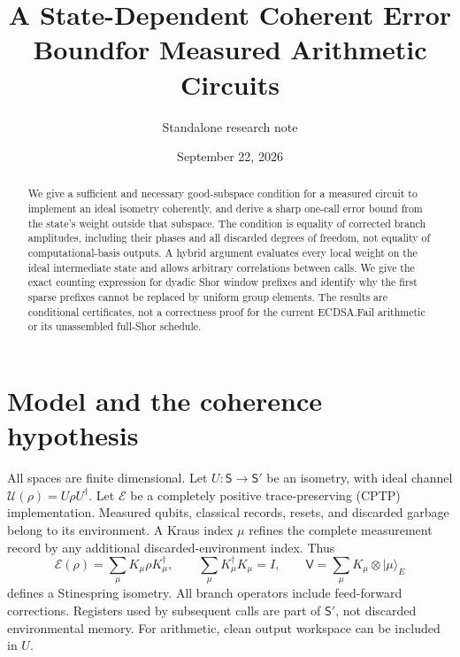 \documentclass[11pt]{article}
\title{A State-Dependent Coherent Error Bound\newline for Measured Arithmetic Circuits}
\author{Standalone research note}
\date{September 22, 2026}
\newcommand{\ket}[1]{\lvert #1\rangle}
\newcommand{\EE}{\mathcal E}
\newcommand{\UU}{\mathcal U}
\newcommand{\VV}{\mathsf V}
\begin{document}
\maketitle

\begin{abstract}
We give a sufficient and necessary good-subspace condition for a measured circuit to implement an ideal isometry coherently, and derive a sharp one-call error bound from the state's weight outside that subspace. The condition is equality of corrected branch amplitudes, including their phases and all discarded degrees of freedom, not equality of computational-basis outputs. A hybrid argument evaluates every local weight on the ideal intermediate state and allows arbitrary correlations between calls. We give the exact counting expression for dyadic Shor window prefixes and identify why the first sparse prefixes cannot be replaced by uniform group elements. The results are conditional certificates, not a correctness proof for the current ECDSA.Fail arithmetic or its unassembled full-Shor schedule.
\end{abstract}

\section{Model and the coherence hypothesis}

All spaces are finite dimensional. Let $U:\mathsf S\to\mathsf S'$ be an isometry, with ideal channel $\UU(\rho)=U\rho U^\dagger$. Let $\EE$ be a completely positive trace-preserving (CPTP) implementation. Measured qubits, classical records, resets, and discarded garbage belong to its environment. A Kraus index $\mu$ refines the complete measurement record by any additional discarded-environment index. Thus
\begin{equation}
 \EE(\rho)=\sum_\mu K_\mu\rho K_\mu^\dagger,
 \qquad \sum_\mu K_\mu^\dagger K_\mu=I,
 \qquad \VV=\sum_\mu K_\mu\otimes\ket{\mu}_E
 \label{eq:dilation}
\end{equation}
defines a Stinespring isometry. All branch operators include feed-forward corrections. Registers used by subsequent calls are part of $\mathsf S'$, not discarded environmental memory. For arithmetic, clean output workspace can be included in $U$.
\end{document}
